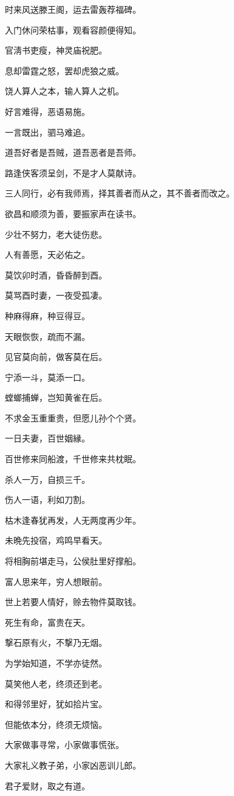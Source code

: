 \documentclass[12pt,oneside]{book}
\begin{document}
时来风送滕王阁，运去雷轰荐福碑。

入门休问荣枯事，观看容颜便得知。

官淸书吏瘦，神灵庙祝肥。

息却雷霆之怒，罢却虎狼之威。

饶人算人之本，输人算人之机。

好言难得，恶语易施。

一言既出，驷马难追。

道吾好者是吾贼，道吾恶者是吾师。

路逢侠客须呈剑，不是才人莫献诗。

三人同行，必有我师焉，择其善者而从之，其不善者而改之。

欲昌和顺须为善，要振家声在读书。

少壮不努力，老大徒伤悲。

人有善愿，天必佑之。

莫饮卯时酒，昏昏醉到酉。

莫骂酉时妻，一夜受孤凄。

种麻得麻，种豆得豆。

天眼恢恢，疏而不漏。

见官莫向前，做客莫在后。

宁添一斗，莫添一口。

螳螂捕蝉，岂知黄雀在后。

不求金玉重重贵，但愿儿孙个个贤。

一日夫妻，百世姻縁。

百世修来同船渡，千世修来共枕眠。

杀人一万，自损三千。

伤人一语，利如刀割。

枯木逢春犹再发，人无两度再少年。

未晩先投宿，鸡鸣早看天。

将相胸前堪走马，公侯肚里好撑船。

富人思来年，穷人想眼前。

世上若要人情好，赊去物件莫取钱。

死生有命，富贵在天。

撃石原有火，不撃乃无烟。

为学始知道，不学亦徒然。

莫笑他人老，终须还到老。

和得邻里好，犹如拾片宝。

但能依本分，终须无烦恼。

大家做事寻常，小家做事慌张。

大家礼义教子弟，小家凶恶训儿郎。

君子爱财，取之有道。
\end{document}
